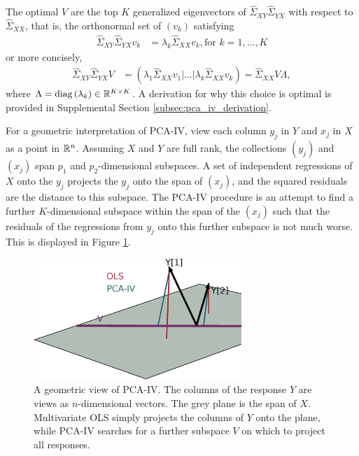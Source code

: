 \documentclass[14pt]{extarticle}
\begin{document}
The optimal $V$ are the top $K$ generalized eigenvectors of
$\hat{\Sigma}_{XY}\hat{\Sigma}_{YX}$ with respect to $\hat{\Sigma}_{XX}$, that
is, the orthonormal set of $\left(v_{k}\right)$ satisfying
\begin{align*}
  \hat{\Sigma}_{XY}\hat{\Sigma}_{YX}v_{k} &= \lambda_{k}
  \hat{\Sigma}_{XX}v_{k}, \text{for } k = 1, \dots, K
\end{align*}
or more concisely,
\begin{align*}
\hat{\Sigma}_{XY}\hat{\Sigma}_{YX}V &= \left( \lambda_{1}
  \hat{\Sigma}_{XX}v_{1} \vert \dots \vert
  \lambda_{k}\hat{\Sigma}_{XX}v_{k}\right) =
\hat{\Sigma}_{XX}V\Lambda,
\end{align*}
where $\Lambda = \mathop\mathrm{diag}\left(\lambda_{k}\right) \in \mathbb{R}^{K \times K}$. A
derivation for why this choice is optimal is provided in Supplemental Section
\ref{subsec:pca_iv_derivation}.

For a geometric interpretation of PCA-IV, view each column $y_{j}$ in $Y$ and
$x_{j}$ in $X$ as a point in $\mathbb{R}^{n}$. Assuming $X$ and $Y$ are full rank,
the collections $\left(y_{j}\right)$ and $\left(x_{j}\right)$ span $p_{1}$ and
$p_{2}$-dimensional subspaces. A set of independent regressions of $X$ onto the
$y_{j}$ projects the $y_{j}$ onto the span of $\left(x_{j}\right)$, and the
squared residuals are the distance to this subspace. The PCA-IV procedure is an
attempt to find a further $K$-dimensional subspace within the span of the
$\left(x_{j}\right)$ such that the residuals of the regressions from $y_j$ onto
this further subspace is not much worse. This is displayed in Figure
\ref{fig:pca_iv_geometry}.

\begin{figure}
  \centering
  \includegraphics[width=0.7\textwidth]{figure/pca_iv/pca_iv_geometry}
  \caption{A geometric view of PCA-IV. The columns of the response $Y$ are views
    as $n$-dimensional vectors. The grey plane is the span of
    $X$. Multivariate OLS simply projects the columns of $Y$ onto the plane,
    while PCA-IV searches for a further subspace $V$ on which to project all
    responses. \label{fig:pca_iv_geometry} }
\end{figure}
\end{document}
